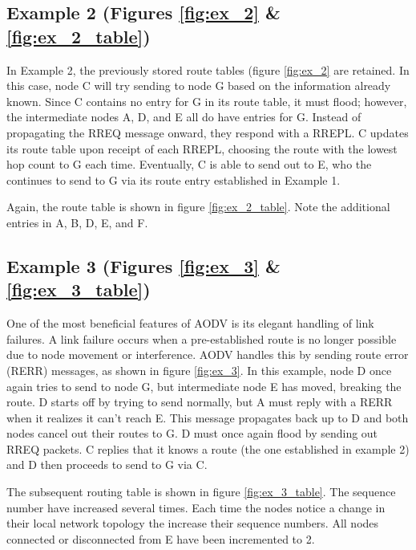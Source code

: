 \documentclass[conference]{IEEEtran}
\begin{document}
\subsection{Example 2 \footnotesize(Figures \ref{fig:ex_2} \& \ref{fig:ex_2_table})}

In Example 2, the previously stored route tables (figure \ref{fig:ex_2} are retained. In this case, node C will try sending to node G based on the information already known. Since C contains no entry for G in its route table, it must flood; however, the intermediate nodes A, D, and E all do have entries for G. Instead of propagating the RREQ message onward, they respond with a RREPL. C updates its route table upon receipt of each RREPL, choosing the route with the lowest hop count to G each time. Eventually, C is able to send out to E, who the continues to send to G via its route entry established in Example 1.

Again, the route table is shown in figure \ref{fig:ex_2_table}. Note the additional entries in A, B, D, E, and F.

\subsection{Example 3 \footnotesize(Figures \ref{fig:ex_3} \& \ref{fig:ex_3_table})}

One of the most beneficial features of AODV is its elegant handling of link failures. A link failure occurs when a pre-established route is no longer possible due to node movement or interference. AODV handles this by sending route error (RERR) messages, as shown in figure \ref{fig:ex_3}. In this example, node D once again tries to send to node G, but intermediate node E has moved, breaking the route. D starts off by trying to send normally, but A must reply with a RERR when it realizes it can't reach E. This message propagates back up to D and both nodes cancel out their routes to G. D must once again flood by sending out RREQ packets. C replies that it knows a route (the one established in example 2) and D then proceeds to send to G via C.

The subsequent routing table is shown in figure \ref{fig:ex_3_table}. The sequence number have increased several times. Each time the nodes notice a change in their local network topology the increase their sequence numbers. All nodes connected or disconnected from E have been incremented to 2.
\end{document}
